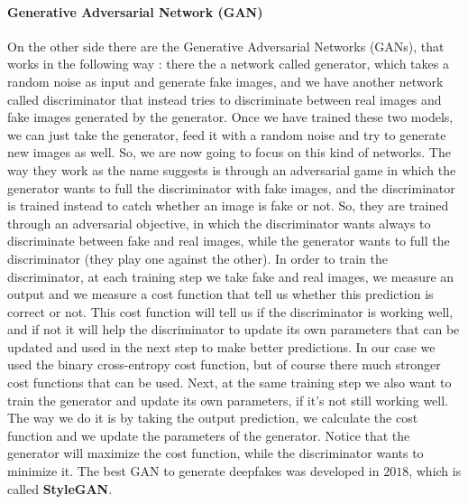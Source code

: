 \documentclass[11pt]{article}
\begin{document}
\paragraph{Generative Adversarial Network (GAN)}
On the other side there are the Generative Adversarial Networks (GANs), that works in the following way : there the a network called generator, which takes a random noise as input and generate fake images, and we have another network called discriminator that instead tries to discriminate between real images and fake images generated by the generator. Once we have trained these two models, we can just take the generator, feed it with a random noise and try to generate new images as well. So, we are now going to focus on this kind of networks. The way they work as the name suggests is through an adversarial game in which the generator wants to full the discriminator with fake images, and the discriminator is trained instead to catch whether an image is fake or not. So, they are trained through an adversarial objective, in which the discriminator wants always to discriminate between fake and real images, while the generator wants to full the discriminator (they play one against the other). In order to train the discriminator, at each training step we take fake and real images, we measure an output and we measure a cost function that tell us whether this prediction is correct or not. This cost function will tell us if the discriminator is working well, and if not it will help the discriminator to update its own parameters that can be updated and used in the next step to make better predictions. In our case we used the binary cross-entropy cost function, but of course there much stronger cost functions that can be used. Next, at the same training step we also want to train the generator and update its own parameters, if it's not still working well. The way we do it is by taking the output prediction, we calculate the cost function and we update the parameters of the generator. Notice that the generator will maximize the cost function, while the discriminator wants to minimize it. The best GAN to generate deepfakes was developed in $2018$, which is called \textbf{StyleGAN}.
\end{document}
